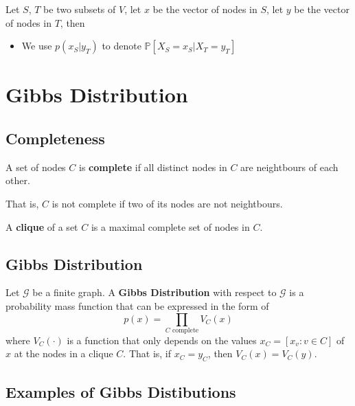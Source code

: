        Let $S$, $T$ be two subsets of $V$, let $x$ be the vector of nodes in $S$, let $y$ be the vector of nodes in $T$, then
        \begin{itemize}
            \item We use $p(x_S|y_T)$ to denote $\mathbb{P}[X_S=x_S|X_T=y_T]$
        \end{itemize}


\section{Gibbs Distribution}
    \subsection{Completeness}
        \begin{definition}\label{Def:CompleteGraph}
            A set of nodes $C$ is \textbf{complete} if all distinct nodes in $C$ are neightbours of each other.
        \end{definition}
        \begin{remark}
            That is, $C$ is not complete if two of its nodes are not neightbours.
        \end{remark}

        \begin{definition}[Clique]\label{Def:Clique}
            A \textbf{clique} of a set $C$ is a maximal complete set of nodes in $C$.
        \end{definition}

    \subsection{Gibbs Distribution}
        \begin{definition}\label{Def:GibbsDistribution}
            Let $\mathcal{G}$ be a finite graph. A \textbf{Gibbs Distribution} with respect to $\mathcal{G}$ is a probability mass function that can be expressed in the form of
            \[ p(x) = \prod_{\text{$C$ complete}}V_C(x) \]
            where $V_C(\cdot)$ is a function that only depends on the values $x_C = [x_v:v \in C]$ of $x$ at the nodes in a clique $C$. That is, if $x_C = y_C$, then $V_C(x) = V_C(y)$.
        \end{definition}

    \subsection{Examples of Gibbs Distibutions}
